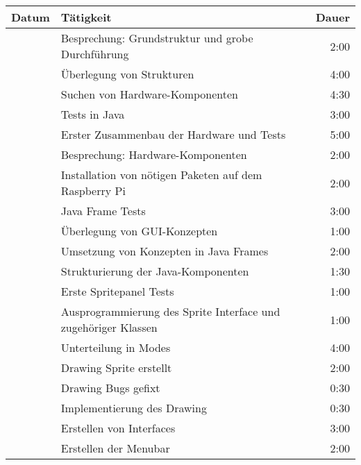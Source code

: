 \begin{longtabu} to \textwidth{l | X | r}
	\textbf{Datum} & \textbf{Tätigkeit} & \textbf{Dauer}\\\hline
	 & Besprechung: Grundstruktur und grobe Durchführung & 2:00\\\hline
	
	 & Überlegung von Strukturen & 4:00\\\hline
	 & Suchen von Hardware-Komponenten & 4:30\\\hline
	 & Tests in Java & 3:00\\\hline
	 & Erster Zusammenbau der Hardware und Tests & 5:00\\\hline
	 & Besprechung: Hardware-Komponenten & 2:00\\\hline
	 & Installation von nötigen Paketen auf dem Raspberry Pi & 2:00\\\hline
	
	 & Java Frame Tests & 3:00\\\hline
	 & Überlegung von GUI-Konzepten & 1:00\\\hline
	 & Umsetzung von Konzepten in Java Frames & 2:00\\\hline
	 & Strukturierung der Java-Komponenten & 1:30\\\hline
	 & Erste Spritepanel Tests & 1:00\\\hline
	 & Ausprogrammierung des Sprite Interface und zugehöriger Klassen & 1:00\\\hline
	 & Unterteilung in Modes & 4:00\\\hline
	 & Drawing Sprite erstellt & 2:00\\\hline
	 & Drawing Bugs gefixt & 0:30\\\hline
	 & Implementierung des Drawing & 0:30\\\hline
	 & Erstellen von Interfaces & 3:00\\\hline
	 & Erstellen der Menubar & 2:00\\\hline
	

\end{longtabu}
